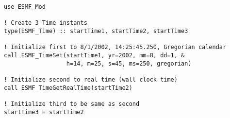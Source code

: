
\begin{verbatim}
use ESMF_Mod

! Create 3 Time instants
type(ESMF_Time) :: startTime1, startTime2, startTime3

! Initialize first to 8/1/2002, 14:25:45.250, Gregorian calendar
call ESMF_TimeSet(startTime1, yr=2002, mm=8, dd=1, &
                  h=14, m=25, s=45, ms=250, gregorian)

! Initialize second to real time (wall clock time)
call ESMF_TimeGetRealTime(startTime2)

! Initialize third to be same as second
startTime3 = startTime2

\end{verbatim}
